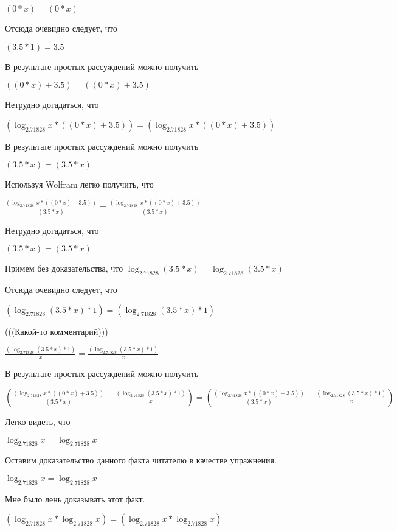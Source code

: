 \documentclass[12pt,a4paper,fleqn]{article}
\theoremstyle{definition}
\begin{document}
$( 0  *  x ) = ( 0  *  x )$

Отсюда очевидно следует, что

$( 3.5  *  1 ) =  3.5 $

В результате простых рассуждений можно получить

$(( 0  *  x ) +  3.5 ) = (( 0  *  x ) +  3.5 )$

Нетрудно догадаться, что

$(\log_{ 2.71828 }{ x } * (( 0  *  x ) +  3.5 )) = (\log_{ 2.71828 }{ x } * (( 0  *  x ) +  3.5 ))$

В результате простых рассуждений можно получить

$( 3.5  *  x ) = ( 3.5  *  x )$

Используя Wolfram легко получить, что

$\frac{(\log_{ 2.71828 }{ x } * (( 0  *  x ) +  3.5 ))}{( 3.5  *  x )}
 = \frac{(\log_{ 2.71828 }{ x } * (( 0  *  x ) +  3.5 ))}{( 3.5  *  x )}
$

Нетрудно догадаться, что

$( 3.5  *  x ) = ( 3.5  *  x )$

Примем без доказательства, что
$\log_{ 2.71828 }{( 3.5  *  x )} = \log_{ 2.71828 }{( 3.5  *  x )}$

Отсюда очевидно следует, что

$(\log_{ 2.71828 }{( 3.5  *  x )} *  1 ) = (\log_{ 2.71828 }{( 3.5  *  x )} *  1 )$

(((Какой-то комментарий)))

$\frac{(\log_{ 2.71828 }{( 3.5  *  x )} *  1 )}{ x }
 = \frac{(\log_{ 2.71828 }{( 3.5  *  x )} *  1 )}{ x }
$

В результате простых рассуждений можно получить

$(\frac{(\log_{ 2.71828 }{ x } * (( 0  *  x ) +  3.5 ))}{( 3.5  *  x )}
 - \frac{(\log_{ 2.71828 }{( 3.5  *  x )} *  1 )}{ x }
) = (\frac{(\log_{ 2.71828 }{ x } * (( 0  *  x ) +  3.5 ))}{( 3.5  *  x )}
 - \frac{(\log_{ 2.71828 }{( 3.5  *  x )} *  1 )}{ x }
)$

Легко видеть, что

$\log_{ 2.71828 }{ x } = \log_{ 2.71828 }{ x }$

Оставим доказательство данного факта читателю в качестве упражнения.

$\log_{ 2.71828 }{ x } = \log_{ 2.71828 }{ x }$

Мне было лень доказывать этот факт.

$(\log_{ 2.71828 }{ x } * \log_{ 2.71828 }{ x }) = (\log_{ 2.71828 }{ x } * \log_{ 2.71828 }{ x })$
\end{document}
